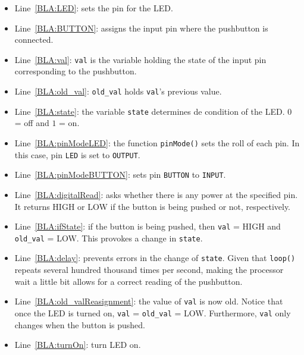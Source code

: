 \begin{itemize}
	\item Line~\ref{BLA:LED}: sets the pin for the LED.
	\item Line~\ref{BLA:BUTTON}: assigns the input pin where the pushbutton is connected.
	\item Line~\ref{BLA:val}: \texttt{val} is the variable holding the state of the input pin corresponding to the pushbutton.
	\item Line~\ref{BLA:old_val}: \texttt{old\_val} holds \texttt{val}'s previous value.
	\item Line~\ref{BLA:state}: the variable \texttt{state} determines de condition of the LED. $0$ = off and $1$ = on.
	\item Line~\ref{BLA:pinModeLED}: the function \texttt{pinMode()} sets the roll of each pin. In this case, pin \texttt{LED} is set to \texttt{OUTPUT}.
	\item Line~\ref{BLA:pinModeBUTTON}: sets pin \texttt{BUTTON} to \texttt{INPUT}.
	\item Line~\ref{BLA:digitalRead}: asks whether there is any power at the specified pin. It returns HIGH or LOW if the button is being pushed or not, respectively.
	\item Line~\ref{BLA:ifState}: if the button is being pushed, then \texttt{val} = HIGH and \texttt{old\_val} = LOW. This provokes a change in \texttt{state}.
	\item Line~\ref{BLA:delay}: prevents errors in the change of \texttt{state}. Given that \texttt{loop()} repeats several hundred thousand times per second, making the processor wait a little bit allows for a correct reading of the pushbutton.
	\item Line~\ref{BLA:old_valReasignment}: the value of \texttt{val} is now old. Notice that once the LED is turned on, \texttt{val} = \texttt{old\_val} = LOW. Furthermore, \texttt{val} only changes when the button is pushed.
	\item Line~\ref{BLA:turnOn}: turn LED on.
\end{itemize}


